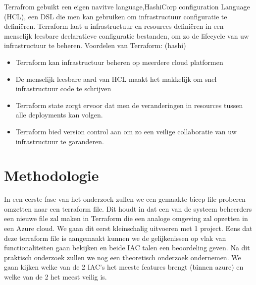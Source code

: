 Terrafrom gebuikt een eigen navitve language,HashiCorp configuration Language (HCL), een DSL die men kan gebruiken om infrastructuur configuratie te definiëren.
Terraform laat u infrastructuur en resources definiëren in een menselijk leesbare declaratieve configuratie bestanden, om zo de lifecycle van uw infrastructuur te beheren.
Voordelen van Terraform:
(hashi)
\begin{itemize}
    \item Terraform kan infrastructuur beheren op meerdere cloud platformen
    \item De menselijk leesbare aard van HCL maakt het makkelijk om snel infrastructuur code te schrijven
    \item Terraform state zorgt ervoor dat men de veranderingen in resources tussen alle deployments kan volgen.
    \item Terraform bied version control aan om zo een veilige collaboratie van uw infrastructuur te garanderen.
    
\end{itemize}
\autocite{Terraform2022}



\section{Methodologie}%
\label{sec:methodologie}

In een eerste fase van het onderzoek zullen we een gemaakte bicep file proberen omzetten naar een terraform file.
Dit houdt in dat een van de systeem beheerders een nieuwe file zal maken in Terraform die een analoge omgeving zal opzetten in een Azure cloud.
We gaan dit eerst kleinschalig uitvoeren  met 1 project.
Eens dat deze terraform file is aangemaakt kunnen we de gelijkenissen op vlak van functionaliteiten gaan bekijken en beide IAC talen een beoordeling geven.
Na dit praktisch onderzoek zullen we nog een theoretisch onderzoek ondernemen. 
We gaan kijken welke van de 2 IAC's het meeste features brengt (binnen azure) en welke van de 2 het meest veilig is.

